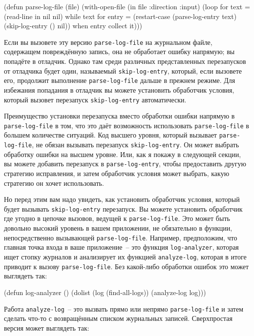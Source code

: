 \begin{myverb}
(defun parse-log-file (file)
  (with-open-file (in file :direction :input)
    (loop for text = (read-line in nil nil) while text
       for entry = (restart-case (parse-log-entry text)
                     (skip-log-entry () nil))
       when entry collect it)))
\end{myverb}

Если вы вызовете эту версию \lstinline{parse-log-file} на журнальном файле, содержащем
повреждённую запись, она не обработает ошибку напрямую; вы попадёте в отладчик. Однако
там среди различных представленных перезапусков от отладчика будет один, называемый
\lstinline{skip-log-entry}, который, если вызовете его, продолжит выполнение
\lstinline{parse-log-file} дальше в прежнем режиме. Для избежания попадания в отладчик вы
можете установить обработчик условия, который вызовет перезапуск \lstinline{skip-log-entry}
автоматически.

Преимущество установки перезапуска вместо обработки ошибки напрямую в
\lstinline{parse-log-file} в том, что это даёт возможность использовать \lstinline{parse-log-file} в
большем количестве ситуаций. Код высшего уровня, который вызывает \lstinline{parse-log-file},
не обязан вызывать перезапуск \lstinline{skip-log-entry}. Он может выбрать обработку ошибки на
высшем уровне. Или, как я покажу в следующей секции, вы можете добавить перезапуск в
\lstinline{parse-log-entry}, чтобы предоставить другую стратегию исправления, и затем обработчик
условия может выбрать, какую стратегию он хочет использовать.

Но перед этим вам надо увидеть, как установить обработчик условия, который будет вызывать
\lstinline{skip-log-entry} перезапуск. Вы можете установить обработчик где угодно в
цепочке вызовов, ведущей к \lstinline{parse-log-file}. Это может быть довольно высокий
уровень в вашем приложении, не обязательно в функции, непосредственно вызывающей
\lstinline{parse-log-file}. Например, предположим, что главная точка входа в ваше
приложение~-- это функция \lstinline{log-analyzer}, которая ищет стопку журналов и
анализирует их функцией \lstinline{analyze-log}, которая в итоге приводит к вызову
\lstinline{parse-log-file}. Без какой-либо обработки ошибок это может выглядеть так:

\begin{myverb}
(defun log-analyzer ()
  (dolist (log (find-all-logs))
    (analyze-log log)))
\end{myverb}

Работа \lstinline{analyze-log}~-- это вызвать прямо или непрямо \lstinline{parse-log-file} и затем
сделать что-то с возвращённым списком журнальных записей. Сверхпростая версия может
выглядеть так:

